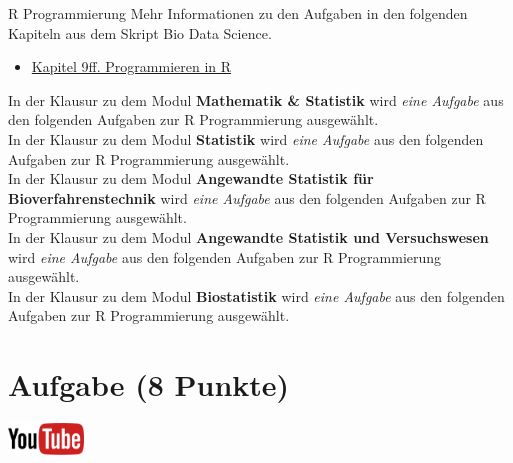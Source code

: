 \documentclass[a4paper, 10pt]{scrartcl}\usepackage[]{graphicx}\usepackage[]{xcolor}
\begin{document}
 
\clearpage
\begin{graybox}{R Programmierung}
Mehr Informationen zu den Aufgaben in den folgenden Kapiteln aus dem Skript Bio Data Science.
  \begin{itemize}
  \item \href{https://jkruppa.github.io/programing-preface.html}{Kapitel 9ff. Programmieren in R}
  \end{itemize}
In der Klausur zu dem Modul \textbf{Mathematik \& Statistik} wird \textit{eine Aufgabe} aus den folgenden Aufgaben zur R Programmierung ausgew{\"a}hlt. \\

In der Klausur zu dem Modul \textbf{Statistik} wird \textit{eine Aufgabe} aus den folgenden Aufgaben zur R Programmierung ausgew{\"a}hlt.  \\

In der Klausur zu dem Modul \textbf{Angewandte Statistik f{\"u}r Bioverfahrenstechnik} wird \textit{eine Aufgabe} aus den folgenden Aufgaben zur R Programmierung ausgew{\"a}hlt.  \\

In der Klausur zu dem Modul \textbf{Angewandte Statistik und Versuchswesen} wird \textit{eine Aufgabe} aus den folgenden Aufgaben zur R Programmierung ausgew{\"a}hlt.  \\

In der Klausur zu dem Modul \textbf{Biostatistik} wird \textit{eine Aufgabe} aus den folgenden Aufgaben zur R Programmierung ausgew{\"a}hlt.  \\

\end{graybox}
\clearpage

\section{Aufgabe \hfill (8 Punkte)}

\hfill\href{https://youtu.be/Bo0VOhBhJmA}{\includegraphics[width =
  2cm]{img/youtube}}\\[1Ex]
\end{document}
